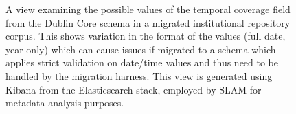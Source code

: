 \begin{figure}[ht!]
  \centering
  \caption{A view examining the possible values of the temporal coverage field from the Dublin Core schema in a migrated institutional repository corpus. This shows variation in the format of the values (full date, year-only) which can cause issues if migrated to a schema which applies strict validation on date/time values and thus need to be handled by the migration harness. This view is generated using Kibana from the Elasticsearch stack, employed by SLAM for metadata analysis purposes.} 
  \label{fig:kibana}
\end{figure}

